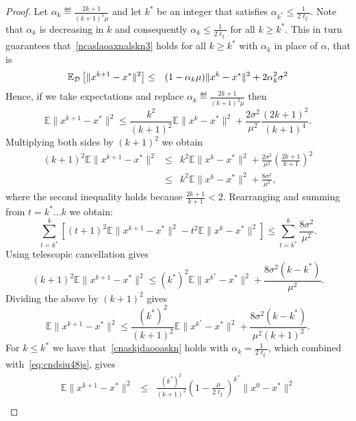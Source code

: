 \documentclass{article}
\begin{document}
\begin{proof}
Let  $\alpha_k \eqdef \frac{2k+1}{(k+1)^2 \mu}$ and let $k^*$ be an integer that satisfies $\alpha_{k^*} \leq \frac{1}{2\ell_\xi}.$ 
Note that $\alpha_k$ is decreasing in $k$ and  consequently $\alpha_k \leq \frac{1}{2\ell_\xi}$ for all $k \geq k^*.$ This in turn guarantees that~\eqref{ncaslaoaxnalskn3} holds for all $k\geq k^*$ with $\alpha_k$ in place of $\alpha$, that is
\begin{eqnarray}
\mathbb{E}_{{\cal D}} \left[ \|x^{k+1}-x^*\|^2 \right]
&\leq & (1-\alpha_k \mu) \|x^k-x^*\|^2+ 2  \alpha_k^2 \sigma^2 
\end{eqnarray}
Hence, if we take expectations and replace  $\alpha_k \eqdef \frac{2k+1}{(k+1)^2 \mu}$ then
\begin{equation}
\mathbb{E}\| x^{k+1}-x^*\|^2 \leq \frac{k^2}{(k+1)^2}\mathbb{E} \|x^k-x^*\|^2 + \frac{2\sigma^2}{\mu^2}\frac{(2k+1)^2}{(k+1)^4 }.
\end{equation}
Multiplying both sides by $(k+1)^2$ we obtain
\begin{eqnarray*}
(k+1)^2 \mathbb{E}\| x^{k+1}-x^*\|^2 &\leq & 
k^2 \mathbb{E} \|x^{k}-x^*\|^2 + \frac{2\sigma^2}{\mu^2} \left(\frac{2k+1}{k+1}\right)^2 \\
 &\leq & k^2 \mathbb{E} \|x^{k}-x^*\|^2 + \frac{8 \sigma^2}{\mu^2},
\end{eqnarray*}
where the second inequality holds because  $\frac{2k+1}{k+1} <2$. Rearranging and summing from $t= k^* \ldots k$ we obtain:
\begin{equation}
\sum_{t=k^*}^{k} \left[ (t+1)^2 \mathbb{E}\| x^{k+1}-x^*\|^2 - t^2 \mathbb{E} \|x^{k}-x^*\|^2 \right] \leq  \sum_{t=k^*}^{k} \frac{8 \sigma^2}{\mu^2}. 
\end{equation}
Using telescopic cancellation gives
\[
(k+1)^2 \mathbb{E}\| x^{k+1}-x^*\|^2 \leq  (k^*)^2 \mathbb{E} \|x^{k^*}-x^*\|^2 +\frac{8 \sigma^2 (k-k^*)}{\mu^2}.
\]
Dividing the above by $(k+1)^2$ gives
\begin{equation}
 \mathbb{E}\| x^{k+1}-x^*\|^2 \leq  \frac{(k^*)^2}{(k+1)^2 } \mathbb{E} \|x^{k^*}-x^*\|^2 +\frac{8 \sigma^2 (k-k^*)}{\mu^2(k+1)^2 }. \label{eq:cndsiu48js}
\end{equation}
For $k \leq k^*$ we have that~\eqref{cnaskjdaooaskn} holds with $\alpha_k=\frac{1}{2 \ell_\xi}$, which combined with~\eqref{eq:cndsiu48js}, gives 
\begin{eqnarray}
 \mathbb{E}\| x^{k+1}-x^*\|^2 &\leq &
  \frac{(k^*)^2}{(k+1)^2 } \left( 1 -  \frac{\mu}{2\ell_{\xi}} \right)^{k^*} \|x^{0}-x^*\|^2 \nonumber \\ &   

\end{eqnarray}
\end{proof}
\end{document}
